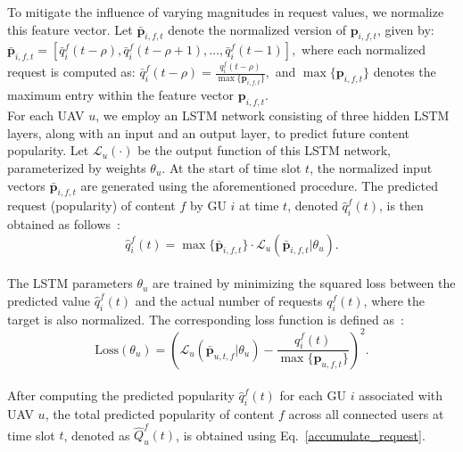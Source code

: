 \documentclass[journal]{IEEEtran}
\begin{document}
To mitigate the influence of varying magnitudes in request values, we normalize this feature vector. Let \( \bar{\textbf{p}}_{i,f,t} \) denote the normalized version of \( \textbf{p}_{i,f,t} \), given by:
\(
\bar{\textbf{p}}_{i,f,t} = \left[ \bar{q}^f_{i}(t - \rho),\bar{q}^f_{i}(t - \rho+1), \dots, \bar{q}^f_{i}(t-1) \right],
\)
where each normalized request is computed as:
\(
\bar{q}^f_{i}(t - \rho) = \frac{q^f_{i}(t - \rho)}{\max \{ \textbf{p}_{i,f,t} \}},
\)
and \( \max \{ \textbf{p}_{i,f,t} \} \) denotes the maximum entry within the feature vector \( \textbf{p}_{i,f,t} \).\\
For each UAV \( u \), we employ an LSTM network consisting of three hidden LSTM layers, along with an input and an output layer, to predict future content popularity. Let \( \mathcal{L}_u(\cdot) \) be the output function of this LSTM network, parameterized by weights \( \theta_u \). At the start of time slot \( t \), the normalized input vectors \( \bar{\textbf{p}}_{i,f,t} \) are generated using the aforementioned procedure. The predicted request (popularity) of content \( f \) by GU \( i \) at time \( t \), denoted \( \hat{q}^f_{i}(t) \), is then obtained as follows~\cite{9234632}:
\begin{equation}
    \hat{q}^f_{i}(t) = \max \{\bar{\textbf{p}}_{i,f,t}\} \cdot \mathcal{L}_u(\bar{\textbf{p}}_{i,f,t}  | \theta_u).
    \label{lstm_predict}
\end{equation} \\
The LSTM parameters \( \theta_u \) are trained by minimizing the squared loss between the predicted value \( \hat{q}^f_{i}(t) \) and the actual number of requests \( q^f_{i}(t) \), where the target is also normalized. The corresponding loss function is defined as~\cite{9234632}:
\begin{equation}
    \text{Loss}(\theta_u) = \left( \mathcal{L}_u(\bar{\textbf{p}}_{u,t,f}  | \theta_u) - \frac{q^f_{i}(t)}{\max\{{\textbf{p}}_{u,f,t} \}} \right)^2.
    \label{lstmloss}
\end{equation}\\
After computing the predicted popularity \( \hat{q}^f_{i}(t) \) for each GU \( i \) associated with UAV \( u \), the total predicted popularity of content \( f \) across all connected users at time slot \( t \), denoted as \( \hat{Q}_{u}^{f}(t) \), is obtained using Eq.~\ref{accumulate_request}.
\end{document}
